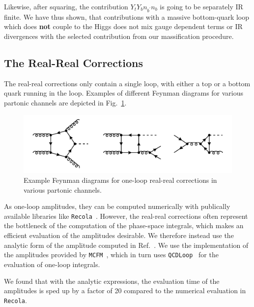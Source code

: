 Likewise, after squaring, the contribution $Y_t Y_b n_{b^\prime} n_{b}$ is going to be separately \acs{IR} finite. We have thus shown, that contributions with a massive bottom-quark loop which does \textbf{not} couple to the Higgs does not mix gauge dependent terms or \acs{IR} divergences with the selected contribution from our massification procedure.

\subsection{The Real-Real Corrections}
The real-real corrections only contain a single loop, with either a top or a bottom quark running in the loop. Examples of different Feynman diagrams for various partonic channels are depicted in Fig.~\ref{fig:5:real_real}.
\begin{figure}[h]
  \centering
  \includegraphics[width=\figurewidth]{Images/NNLO_Feynman_diagrams/RealReal.pdf}
  \caption{Example Feynman diagrams for one-loop real-real corrections in various partonic channels.}
  \label{fig:5:real_real}
\end{figure}

As one-loop amplitudes, they can be computed numerically with publically available libraries like \texttt{Recola}~\cite{Actis:2016mpe}. However, the real-real corrections often represent the bottleneck of the computation of the phase-space integrals, which makes an efficient evaluation of the amplitudes desirable. We therefore instead use the analytic form of the amplitude computed in Ref.~\cite{Budge:2020oyl}. We use the implementation of the amplitudes provided by \texttt{MCFM}~\cite{Campbell:2019dru, Campbell:1999ah, Campbell:2011bn}, which in turn uses \texttt{QCDLoop}~\cite{Ellis:2007qk, Carrazza:2016gav} for the evaluation of one-loop integrals.

We found that with the analytic expressions, the evaluation time of the amplitudes is sped up by a factor of 20 compared to the numerical evaluation in \texttt{Recola}.

